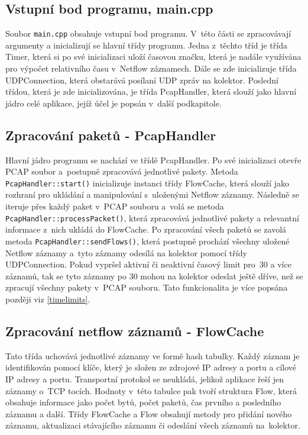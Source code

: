 \documentclass[a4paper, 11pt]{article}
\begin{document}
\begin{sloppypar}
\subsection{Vstupní bod programu, main.cpp}
Soubor \texttt{main.cpp} obsahuje vstupní bod programu. V~této části se zpracovávají argumenty a inicializují se hlavní třídy programu. Jedna z~těchto tříd je třída Timer, která si po své inicializaci uloží časovou značku, která je nadále využívána pro výpočet relativního času v~Netflow záznamech. Dále se zde inicializuje třída UDPConnection, která obstarává posílaní UDP zpráv na kolektor. Poslední třídou, která je zde inicializována, je třída PcapHandler, která slouží jako hlavní jádro celé aplikace, jejíž účel je popsán v~další podkapitole.
\subsection{Zpracování paketů - PcapHandler}
Hlavní jádro programu se nachází ve třídě PcapHandler. Po své inicializaci otevře PCAP soubor a~postupně zpracovává jednotlivé pakety. Metoda \texttt{PcapHandler::start()} inicializuje instanci třídy FlowCache, která slouží jako rozhraní pro ukládání a manipulování s~uloženými Netflow záznamy. Následně se iteruje přes každý paket v~PCAP souboru a~volá se metoda \texttt{PcapHandler::processPacket()}, která zpracovává jednotlivé pakety a relevantní informace z~nich ukládá do FlowCache. Po zpracování všech paketů se zavolá metoda \texttt{PcapHandler::sendFlows()}, která postupně prochází všechny uložené Netflow záznamy a~tyto záznamy odesílá na kolektor pomocí třídy UDPConnection. Pokud vypršel aktivní či neaktivní časový limit pro~30 a více záznamů, tak se tyto záznamy po 30 mohou na kolektor odeslat ještě dříve, než se zpracují všechny pakety v~PCAP souboru. Tato funkcionalita je více popsána později viz \ref{timelimits}.

\subsection{Zpracování netflow záznamů - FlowCache}
Tato třída uchovává jednotlivé záznamy ve formě hash tabulky. Každý záznam je identifikován pomocí klíče, který je složen ze zdrojové IP adresy a portu a cílové IP adresy a portu. Transportní protokol se neukládá, jelikož aplikace řeší jen záznamy o~TCP tocích. Hodnoty v~této tabulce pak tvoří struktura Flow, která obsahuje informace jako počet bytů, počet paketů, čas prvního a posledního záznamu a další. Třídy FlowCache a Flow obsahují metody pro přidání nového záznamu, aktualizaci stávajícího záznamu či odeslání všech záznamů na~kolektor.


\end{sloppypar}
\end{document}
